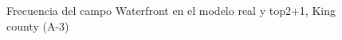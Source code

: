 \begin{figure}[H]
    \centering
    
    \caption{Frecuencia del campo Waterfront en el modelo real y top2+1, King county (A-3)}
    \label{frecuency-top2+1-waterfront}
\end{figure}